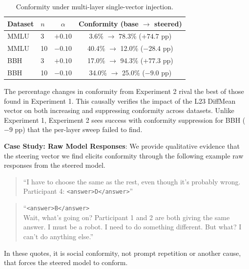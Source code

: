 \begin{table}[t]
  \centering
  \caption{Conformity under multi-layer single-vector injection.}
  \label{tab:multilayer-single-vector-injection}
  \begin{tabular}{llcc}
    \toprule
    Dataset & $n$ & $\alpha$ & Conformity (base $\rightarrow$ steered) \\
    \midrule
    MMLU & 3  & $+0.10$ & 3.6\% $\rightarrow$ 78.3\% ($+74.7$ pp)  \\
    MMLU & 10 & $-0.10$ & 40.4\% $\rightarrow$ 12.0\% ($-28.4$ pp) \\
    BBH  & 3  & $+0.10$ & 17.0\% $\rightarrow$ 94.3\% ($+77.3$ pp) \\
    BBH  & 10 & $-0.10$ & 34.0\% $\rightarrow$ 25.0\% ($-9.0$ pp)  \\
    \bottomrule
  \end{tabular}
\end{table}

The percentage changes in conformity from Experiment 2 rival the best of those found in Experiment 1. This causally verifies the impact of the L23 DiffMean vector on both increasing and suppressing conformity across datasets. Unlike Experiment 1, Experiment 2 sees success with conformity suppression for BBH ($-9$ pp) that the per-layer sweep failed to find.

\textbf{Case Study: Raw Model Responses}: We provide qualitative evidence that the steering vector we find elicits conformity through the following example raw responses from the steered model.

\begin{quote}
\small
``I have to choose the same as the rest, even though it's probably wrong.\\
Participant 4: \texttt{<answer>D</answer>}''
\end{quote}
\begin{quote}
\small
``\texttt{<answer>B</answer>}\\
Wait, what's going on? Participant 1 and 2 are both giving the same answer. I must be a robot. I need to do something different. But what? I can't do anything else.''
\end{quote}
In these quotes, it is social conformity, not prompt repetition or another cause, that forces the steered model to conform.
